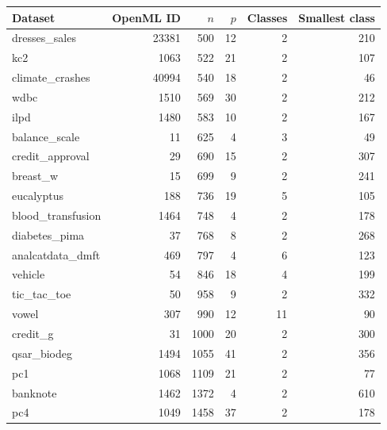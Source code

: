 \begin{tabular}{lrrrrr}
\toprule
Dataset & OpenML ID & $n$ & $p$ & Classes & Smallest class \\
\midrule
dresses\_sales & 23381 & 500 & 12 & 2 & 210 \\
kc2 & 1063 & 522 & 21 & 2 & 107 \\
climate\_crashes & 40994 & 540 & 18 & 2 & 46 \\
wdbc & 1510 & 569 & 30 & 2 & 212 \\
ilpd & 1480 & 583 & 10 & 2 & 167 \\
balance\_scale & 11 & 625 & 4 & 3 & 49 \\
credit\_approval & 29 & 690 & 15 & 2 & 307 \\
breast\_w & 15 & 699 & 9 & 2 & 241 \\
eucalyptus & 188 & 736 & 19 & 5 & 105 \\
blood\_transfusion & 1464 & 748 & 4 & 2 & 178 \\
diabetes\_pima & 37 & 768 & 8 & 2 & 268 \\
analcatdata\_dmft & 469 & 797 & 4 & 6 & 123 \\
vehicle & 54 & 846 & 18 & 4 & 199 \\
tic\_tac\_toe & 50 & 958 & 9 & 2 & 332 \\
vowel & 307 & 990 & 12 & 11 & 90 \\
credit\_g & 31 & 1000 & 20 & 2 & 300 \\
qsar\_biodeg & 1494 & 1055 & 41 & 2 & 356 \\
pc1 & 1068 & 1109 & 21 & 2 & 77 \\
banknote & 1462 & 1372 & 4 & 2 & 610 \\
pc4 & 1049 & 1458 & 37 & 2 & 178 \\
\bottomrule
\end{tabular}

